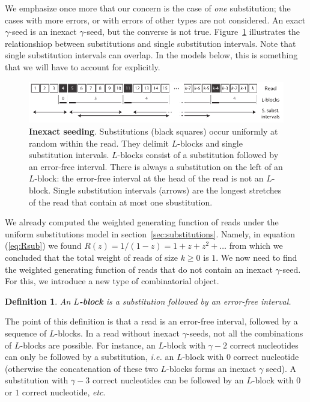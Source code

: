\documentclass{article}
\newtheorem{definition}{Definition}
\begin{document}
We emphasize once more that our concern is the case of \emph{one}
substitution; the cases with more errors, or with errors of other types
are not considered. An exact $\gamma$-seed is an inexact $\gamma$-seed,
but the converse is not true. Figure~\ref{fig:sketchinexact} illustrates
the relationshiop between substitutions and single substitution intervals.
Note that single substitution intervals can overlap. In the models below,
this is something that we will have to account for explicitly.

\begin{figure}[h]
\centering
\includegraphics[scale=0.88]{sketch_inexact_seeding.pdf}
\caption{\textbf{Inexact seeding}. Substitutions (black squares) occur
uniformly at random within the read. They delimit $L$-blocks and single
substitution intervals. $L$-blocks consist of a substitution followed by
an error-free interval. There is always a substitution on the left of an
$L$-block: the error-free interval at the head of the read is
not an $L$-block. Single substitution intervals (arrows) are the longest
stretches of the read that contain at most one sbustitution.}
\label{fig:sketchinexact}
\end{figure}


We already computed the weighted generating function of reads under the
uniform substitutions model in section~\ref{sec:substitutions}. Namely, in
equation (\ref{eq:Rsub}) we found $R(z) = 1/(1-z) = 1 + z + z^2 + \ldots$
from which we concluded that the total weight of reads of size $k \geq 0$
is $1$. We now need to find the weighted generating function of reads that
do not contain an inexact $\gamma$-seed. For this, we introduce a new type
of combinatorial object.

\begin{definition}
An \textbf{$L$-block} is a substitution followed by an error-free
interval.
\end{definition}

The point of this definition is that a read is an error-free interval,
followed by a sequence of $L$-blocks. In a read without inexact
$\gamma$-seeds, not all the combinations of $L$-blocks are possible. For
instance, an $L$-block with $\gamma-2$ correct nucleotides can only be
followed by a substitution, \textit{i.e.} an $L$-block with $0$ correct
nucleotide (otherwise the concatenation of these two $L$-blocks forms an
inexact $\gamma$ seed). A substitution with $\gamma-3$ correct nucleotides
can be followed by an $L$-block with $0$ or $1$ correct nucleotide,
\textit{etc}.
\end{document}
